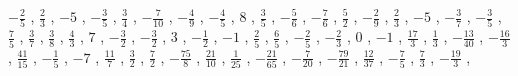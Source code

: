 \documentclass[12pt]{article}
\theoremstyle{note}
\begin{document}
\begin{flushleft}
$ \scriptstyle- \frac{2}{5}$ , $ \scriptstyle\frac{2}{3}$ , $ \scriptstyle-5$ , $ \scriptstyle- \frac{3}{5}$ , $ \scriptstyle\frac{3}{4}$ , $ \scriptstyle- \frac{7}{10}$ , $ \scriptstyle- \frac{4}{9}$ , $ \scriptstyle- \frac{4}{5}$ , $ \scriptstyle8$ , $ \scriptstyle\frac{3}{5}$ , $ \scriptstyle- \frac{5}{6}$ , $ \scriptstyle- \frac{7}{6}$ , $ \scriptstyle\frac{5}{2}$ , $ \scriptstyle- \frac{2}{9}$ , $ \scriptstyle\frac{2}{3}$ , $ \scriptstyle-5$ , $ \scriptstyle- \frac{3}{7}$ , $ \scriptstyle- \frac{3}{5}$ , $ \scriptstyle\frac{7}{5}$ , $ \scriptstyle\frac{3}{7}$ , $ \scriptstyle\frac{3}{8}$ , $ \scriptstyle\frac{4}{3}$ , $ \scriptstyle7$ , $ \scriptstyle- \frac{3}{2}$ , $ \scriptstyle- \frac{3}{2}$ , $ \scriptstyle3$ , $ \scriptstyle- \frac{1}{2}$ , $ \scriptstyle-1$ , $ \scriptstyle\frac{2}{5}$ , $ \scriptstyle\frac{6}{5}$ , $ \scriptstyle- \frac{2}{5}$ , $ \scriptstyle- \frac{2}{3}$ , $ \scriptstyle0$ , $ \scriptstyle-1$ , $ \scriptstyle\frac{17}{3}$ , $ \scriptstyle\frac{1}{3}$ , $ \scriptstyle- \frac{13}{40}$ , $ \scriptstyle- \frac{16}{3}$ , $ \scriptstyle\frac{41}{15}$ , $ \scriptstyle- \frac{1}{5}$ , $ \scriptstyle-7$ , $ \scriptstyle\frac{11}{7}$ , $ \scriptstyle\frac{3}{2}$ , $ \scriptstyle\frac{7}{2}$ , $ \scriptstyle- \frac{75}{8}$ , $ \scriptstyle\frac{21}{10}$ , $ \scriptstyle\frac{1}{25}$ , $ \scriptstyle- \frac{21}{65}$ , $ \scriptstyle- \frac{7}{20}$ , $ \scriptstyle- \frac{79}{21}$ , $ \scriptstyle\frac{12}{37}$ , $ \scriptstyle- \frac{7}{5}$ , $ \scriptstyle\frac{7}{3}$ , $ \scriptstyle- \frac{19}{3}$ , \end{flushleft} 
    
\end{document}
